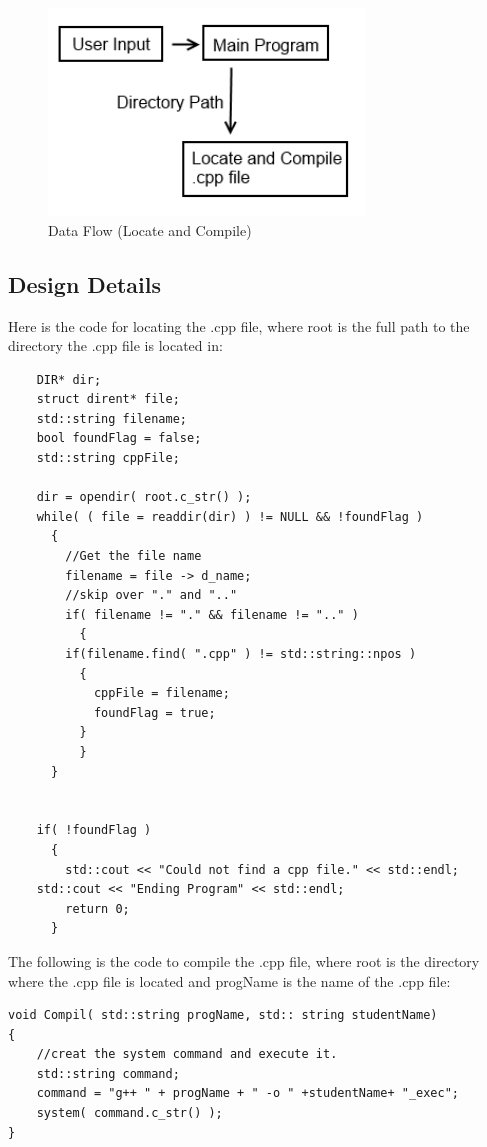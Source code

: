 \begin{figure}[tbh]
\begin{center}
\includegraphics[width=0.75\textwidth]{./DataFlow1}
\end{center}
\caption{Data Flow (Locate and Compile) \label{DataFlow1}}
\end{figure}


\subsection{Design Details}
Here is the code for locating the .cpp file, where root is the full path to the directory the .cpp file is located in:
\begin{lstlisting}
    DIR* dir;
    struct dirent* file;
    std::string filename;
    bool foundFlag = false;
    std::string cppFile;

    dir = opendir( root.c_str() );
    while( ( file = readdir(dir) ) != NULL && !foundFlag )
      {
        //Get the file name
        filename = file -> d_name;
        //skip over "." and ".."
        if( filename != "." && filename != ".." )
          {
        if(filename.find( ".cpp" ) != std::string::npos )
          {
            cppFile = filename;
            foundFlag = true;
          }
          }
      }


    if( !foundFlag )
      {
        std::cout << "Could not find a cpp file." << std::endl;
	std::cout << "Ending Program" << std::endl;
        return 0;
      }
\end{lstlisting}

The following is the code to compile the .cpp file, where root is the directory where the .cpp file is located
and progName is the name of the .cpp file:
\begin{lstlisting}
void Compil( std::string progName, std:: string studentName)
{
    //creat the system command and execute it.
    std::string command;
    command = "g++ " + progName + " -o " +studentName+ "_exec";
    system( command.c_str() );
}
\end{lstlisting}



